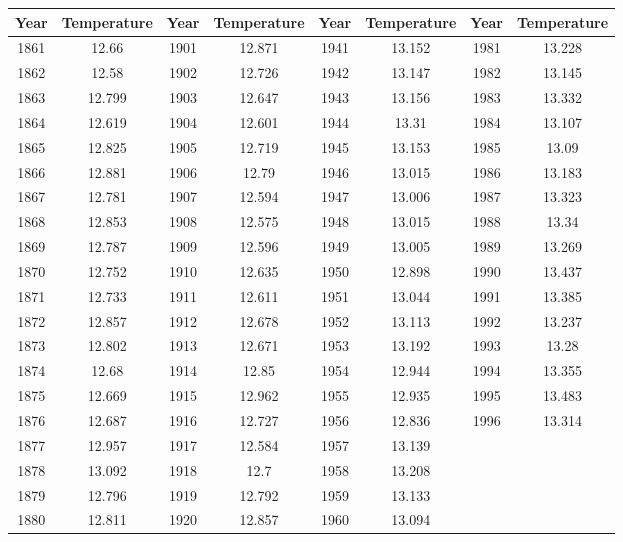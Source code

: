 \documentclass[10pt,a4paper,titlepage,twoside,openright]{report}
\begin{document}
\begin{table}[htb!]
\begin{center}
\begin{small}
\begin{tabular}{|c|c||c|c||c|c||c|c|}\hline
Year & Temperature & Year & Temperature & Year & Temperature & Year & Temperature \\\hline\hline
1861 & 12.66 & 1901 & 12.871 & 1941 & 13.152 & 1981 & 13.228\\\hline
1862 & 12.58 & 1902 & 12.726 & 1942 & 13.147 & 1982 & 13.145\\\hline
1863 & 12.799 & 1903 & 12.647 & 1943 & 13.156 & 1983 & 13.332\\\hline
1864 & 12.619 & 1904 & 12.601 & 1944 & 13.31 & 1984 & 13.107\\\hline
1865 & 12.825 & 1905 & 12.719 & 1945 & 13.153 & 1985 & 13.09\\\hline
1866 & 12.881 & 1906 & 12.79 & 1946 & 13.015 & 1986 & 13.183\\\hline
1867 & 12.781 & 1907 & 12.594 & 1947 & 13.006 & 1987 & 13.323\\\hline
1868 & 12.853 & 1908 & 12.575 & 1948 & 13.015 & 1988 & 13.34\\\hline
1869 & 12.787 & 1909 & 12.596 & 1949 & 13.005 & 1989 & 13.269\\\hline
1870 & 12.752 & 1910 & 12.635 & 1950 & 12.898 & 1990 & 13.437\\\hline
1871 & 12.733 & 1911 & 12.611 & 1951 & 13.044 & 1991 & 13.385\\\hline
1872 & 12.857 & 1912 & 12.678 & 1952 & 13.113 & 1992 & 13.237\\\hline
1873 & 12.802 & 1913 & 12.671 & 1953 & 13.192 & 1993 & 13.28\\\hline
1874 & 12.68 & 1914 & 12.85 & 1954 & 12.944 & 1994 & 13.355\\\hline
1875 & 12.669 & 1915 & 12.962 & 1955 & 12.935 & 1995 & 13.483\\\hline
1876 & 12.687 & 1916 & 12.727 & 1956 & 12.836 & 1996 & 13.314\\\hline
1877 & 12.957 & 1917 & 12.584 & 1957 & 13.139 & & \\\hline
1878 & 13.092 & 1918 & 12.7 & 1958 & 13.208 & & \\\hline
1879 & 12.796 & 1919 & 12.792 & 1959 & 13.133 & & \\\hline
1880 & 12.811 & 1920 & 12.857 & 1960 & 13.094 & & \\\hline

\end{tabular}
\end{small}
\end{center}
\end{table}
\end{document}
